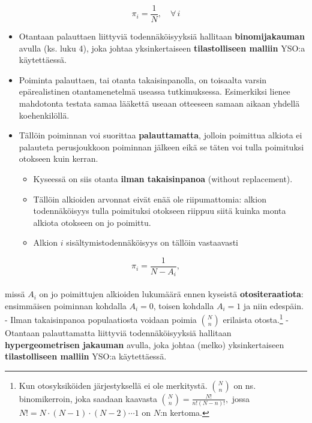 \documentclass[
]{book}
\providecommand{\tightlist}{%
  \setlength{\itemsep}{0pt}\setlength{\parskip}{0pt}}
\begin{document}
\[
\pi_i = \frac{1}{N}, \quad \forall \, i
\]

\begin{itemize}
\item
  Otantaan palauttaen liittyviä todennäköisyyksiä hallitaan \textbf{binomijakauman} avulla (ks. luku 4), joka johtaa yksinkertaiseen \textbf{tilastolliseen malliin} YSO:a käytettäessä.
\item
  Poiminta palauttaen, tai otanta takaisinpanolla, on toisaalta varsin epärealistinen otantamenetelmä useassa tutkimuksessa. Esimerkiksi lienee mahdotonta testata samaa lääkettä useaan otteeseen samaan aikaan yhdellä koehenkilöllä.
\item
  Tällöin poiminnan voi suorittaa \textbf{palauttamatta}, jolloin poimittua alkiota ei palauteta perusjoukkoon poiminnan jälkeen eikä se täten voi tulla poimituksi otokseen kuin kerran.

  \begin{itemize}
  \tightlist
  \item
    Kyseessä on siis otanta \textbf{ilman takaisinpanoa} (without replacement).
  \item
    Tällöin alkioiden arvonnat eivät enää ole riipumattomia: alkion todennäköisyys tulla poimituksi otokseen riippuu siitä kuinka monta alkiota otokseen on jo poimittu.
  \item
    Alkion \(i\) sisältymistodennäköisyys on tällöin vastaavasti
  \end{itemize}
\end{itemize}

\[
\pi_i = \frac{1}{N - A_i},
\]\\
missä \(A_i\) on jo poimittujen alkioiden lukumäärä ennen kyseistä \textbf{otositeraatiota}: ensimmäisen poiminnan kohdalla \(A_i = 0\), toisen kohdalla \(A_i = 1\) ja niin edespäin.
- Ilman takaisinpanoa populaatiosta voidaan poimia \({N \choose n}\) erilaista otosta.\footnote{{} Kun otosyksiköiden järjestyksellä ei ole merkitystä. ${N \choose n}$ on ns. binomikerroin, joka saadaan kaavasta ${N \choose n} = \frac{N!}{n!(N-n)!},$ jossa $N! = N \cdot (N-1) \cdot (N-2) \cdots 1$ on $N$:n kertoma.}
- Otantaan palauttamatta liittyviä todennäköisyyksiä hallitaan \textbf{hypergeometrisen jakauman} avulla, joka johtaa (melko) yksinkertaiseen \textbf{tilastolliseen malliin} YSO:a käytettäessä.
\end{document}
